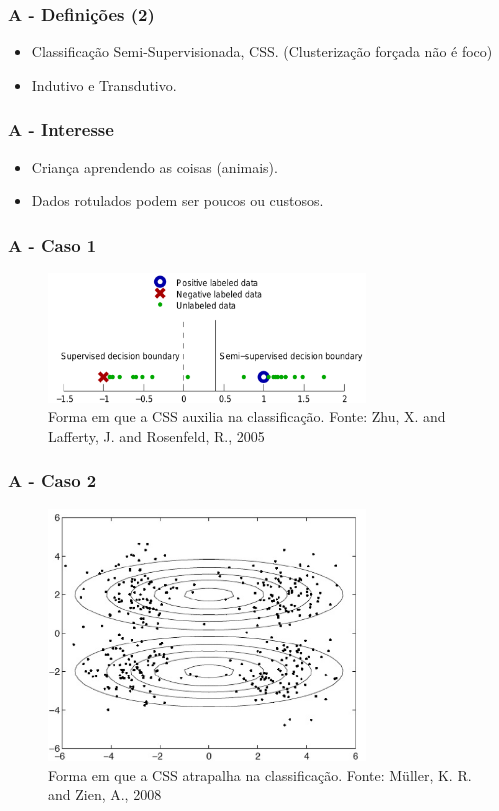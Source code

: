 \documentclass{beamer}
\begin{document}
      \frame
      {
        \frametitle{A - Definições (2)}
        \begin{itemize}
          \item <1-> Classificação Semi-Supervisionada, CSS. (Clusterização forçada não é foco)
          \item <2-> Indutivo e Transdutivo.
        \end{itemize}
      }

      \frame
      {
        \frametitle{A - Interesse}
        \begin{itemize}
          \item <1-> Criança aprendendo as coisas (animais).
          \item <2-> Dados rotulados podem ser poucos ou custosos.
        \end{itemize}
      }
          
      \frame
      {
        \frametitle{A - Caso 1}
        \begin{figure}[!h]
        \begin{center}
                \includegraphics[width=0.75\textwidth]{ssl-help}
        \end{center}
        \caption{Forma em que a CSS auxilia na classificação. Fonte: Zhu, X. and Lafferty, J. and Rosenfeld, R., 2005}
      \end{figure}
      }

      \frame
      {
        \frametitle{A - Caso 2}
        \begin{figure}[!h]
        \begin{center}
                \includegraphics[width=0.75\textwidth]{ssl-nhelp}
        \end{center}
        \caption{Forma em que a CSS atrapalha na classificação. Fonte: Müller, K. R. and Zien, A., 2008}
      \end{figure}
      }
\end{document}
